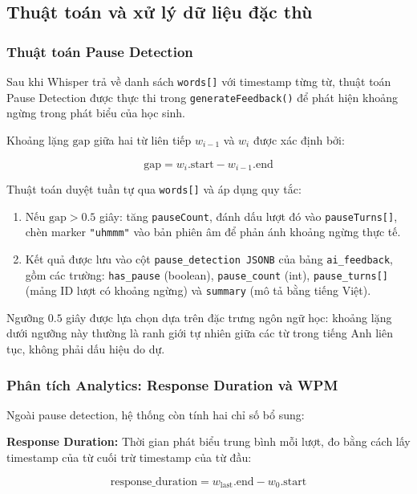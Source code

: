 \subsection{Thuật toán và xử lý dữ liệu đặc thù}

\subsubsection{Thuật toán Pause Detection}

Sau khi Whisper trả về danh sách \texttt{words[]} với timestamp từng từ, thuật toán Pause Detection được thực thi trong \texttt{generateFeedback()} để phát hiện khoảng ngừng trong phát biểu của học sinh.

Khoảng lặng $\text{gap}$ giữa hai từ liên tiếp $w_{i-1}$ và $w_i$ được xác định bởi:

$$\text{gap} = w_i.\text{start} - w_{i-1}.\text{end}$$

Thuật toán duyệt tuần tự qua \texttt{words[]} và áp dụng quy tắc:

\begin{enumerate}
    \item Nếu $\text{gap} > 0.5$ giây: tăng \texttt{pauseCount}, đánh dấu lượt đó vào \texttt{pauseTurns[]}, chèn marker \texttt{"uhmmm"} vào bản phiên âm để phản ánh khoảng ngừng thực tế.
    \item Kết quả được lưu vào cột \texttt{pause\_detection JSONB} của bảng \texttt{ai\_feedback}, gồm các trường: \texttt{has\_pause} (boolean), \texttt{pause\_count} (int), \texttt{pause\_turns[]} (mảng ID lượt có khoảng ngừng) và \texttt{summary} (mô tả bằng tiếng Việt).
\end{enumerate}

Ngưỡng $0.5$ giây được lựa chọn dựa trên đặc trưng ngôn ngữ học: khoảng lặng dưới ngưỡng này thường là ranh giới tự nhiên giữa các từ trong tiếng Anh liên tục, không phải dấu hiệu do dự.

\subsubsection{Phân tích Analytics: Response Duration và WPM}

Ngoài pause detection, hệ thống còn tính hai chỉ số bổ sung:

\textbf{Response Duration:} Thời gian phát biểu trung bình mỗi lượt, đo bằng cách lấy timestamp của từ cuối trừ timestamp của từ đầu:

$$\text{response\_duration} = w_{\text{last}}.\text{end} - w_0.\text{start}$$

